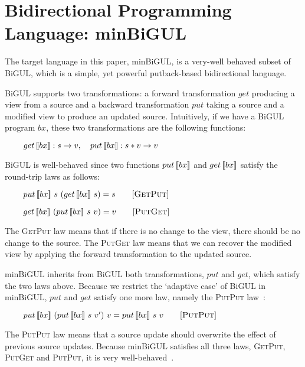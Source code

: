 \section{Bidirectional Programming Language: minBiGUL} \label{sect:minbigul}

The target language in this paper, minBiGUL, is a very-well behaved subset of BiGUL, which is a simple, yet powerful putback-based bidirectional language. 

BiGUL supports two transformations: a forward transformation $get$ producing a view from a source and a backward transformation $put$ taking a source and a modified view to produce an updated source. Intuitively, if we have a BiGUL program $bx$, these two transformations are the following functions:

 \smallvspace
    $\hspace*{3mm} \ \quad get \, [\![bx]\!] : s \to v, \quad put \, [\![bx]\!] : s * v \to v$
 \smallvspace
 
BiGUL is well-behaved \cite{Pacheco:2014:MCP:2543728.2543737} since two functions $put \, [\![bx]\!]$ and $get \, [\![bx]\!]$ satisfy the round-trip laws as follows:

\smallvspace
    $\hspace*{3mm} \ \quad put \, [\![bx]\!] \ s \ (get \, [\![bx]\!] \ s) = s \qquad [\textsc{GetPut}]$
    
    $\hspace*{3mm} \ \quad get \, [\![bx]\!] \ (put \, [\![bx]\!] \ s \ v) = v \qquad [\textsc{PutGet}]$
\smallvspace

\noindent The \textsc{GetPut} law means that if there is no change to the view, there should be no change to the source. The \textsc{PutGet} law means that we can recover the modified view by applying the forward transformation to the updated source.

minBiGUL inherits from BiGUL both 
transformations, $put$ and $get$, which satisfy the two laws above. 
Because we restrict the `adaptive case' of BiGUL in minBiGUL,
$put$ and $get$ satisfy one more law, namely the \textsc{PutPut} law~\cite{Foster:2007:CBT:1232420.1232424}:

\smallvspace
$\hspace*{3mm} \ \quad put \, [\![bx]\!] \ (put \, [\![bx]\!] \ s \ v') \ v = put \, [\![bx]\!] \ s \ v \qquad [\textsc{PutPut}]$
\smallvspace

\noindent The \textsc{PutPut} law means that a source update should overwrite the effect of previous source updates. 
Because minBiGUL satisfies all three laws, \textsc{GetPut}, \textsc{PutGet} and \textsc{PutPut}, it is very well-behaved~\cite{Foster:2007:CBT:1232420.1232424}.


